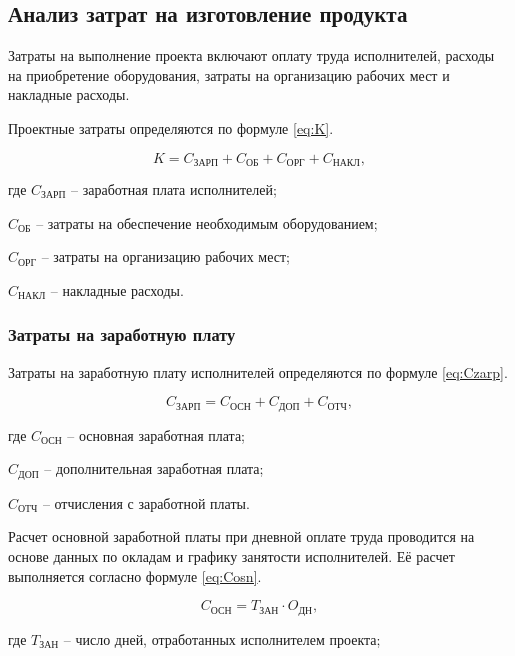 \subsection{Анализ затрат на изготовление продукта}

Затраты на выполнение проекта включают оплату труда исполнителей, расходы на приобретение оборудования, затраты на организацию рабочих мест и накладные расходы.

Проектные затраты определяются по формуле \eqref{eq:K}.

\begin{equation}\label{eq:K}
K = C_{\text{ЗАРП}} + C_{\text{ОБ}} + C_{\text{ОРГ}} + C_{\text{НАКЛ}},
\end{equation}

где $C_{\text{ЗАРП}}$ -- заработная плата исполнителей;

$C_{\text{ОБ}}$ -- затраты на обеспечение необходимым оборудованием;

$C_{\text{ОРГ}}$ -- затраты на организацию рабочих мест;

$C_{\text{НАКЛ}}$ -- накладные расходы.

\subsubsection{Затраты на заработную плату}

Затраты на заработную плату исполнителей определяются по формуле \eqref{eq:Czarp}.

\begin{equation}\label{eq:Czarp}
C_{\text{ЗАРП}} = C_{\text{ОСН}} + C_{\text{ДОП}} + C_{\text{ОТЧ}},
\end{equation}

где $C_{\text{ОСН}}$ -- основная заработная плата;

$C_{\text{ДОП}}$ -- дополнительная заработная плата;

$C_{\text{ОТЧ}}$ -- отчисления с заработной платы.

Расчет основной заработной платы при дневной оплате труда проводится на основе данных по окладам и графику занятости исполнителей. Её расчет выполняется согласно формуле  \eqref{eq:Cosn}.

\begin{equation}\label{eq:Cosn}
C_{\text{ОСН}} = T_{\text{ЗАН}} \cdot O_{\text{ДН}},
\end{equation}

где $T_{\text{ЗАН}}$ -- число дней, отработанных исполнителем проекта;

